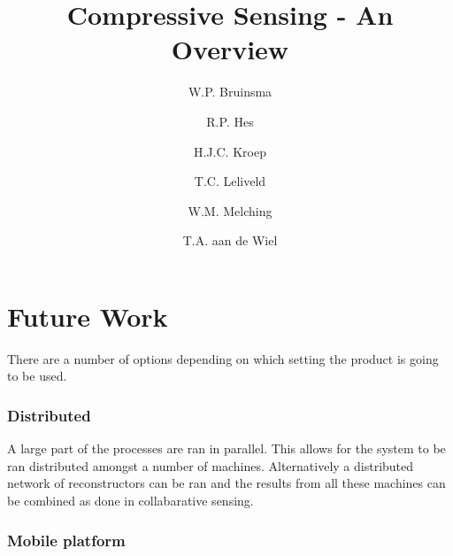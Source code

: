 \documentclass[a4paper, openany, oneside]{memoir}
\title{Compressive Sensing - An Overview}
\author{W.P. Bruinsma \and R.P. Hes \and H.J.C. Kroep \and T.C. Leliveld \and W.M. Melching \and T.A. aan de Wiel}
\begin{document}
\chapter{Future Work}
There are a number of options depending on which setting the product is going to be used.

\subsection{Distributed}
\label{sec:distributed}
A large part of the processes are ran in parallel. This allows for the system to be ran distributed amongst a number of machines. Alternatively a distributed network of reconstructors can be ran and the results from all these machines can be combined as done in collabarative sensing.

\subsection{Mobile platform}
\label{sub:mobile_platform}
\end{document}
